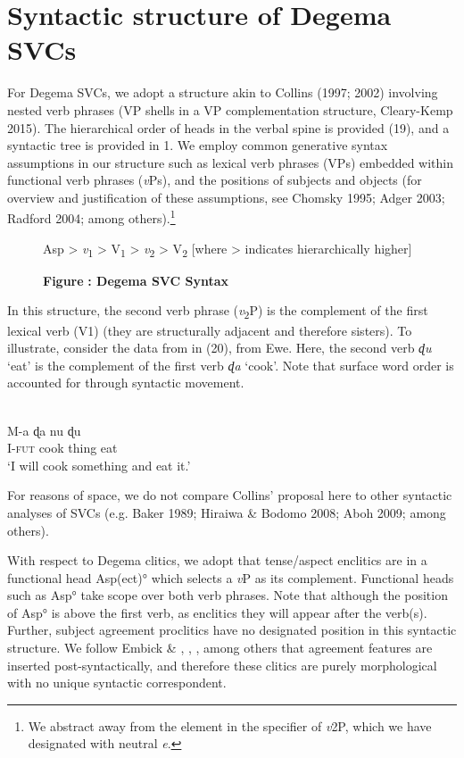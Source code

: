 \documentclass[output=paper]{langsci/langscibook}
\begin{document}
\section{Syntactic structure of Degema SVCs}
For Degema SVCs, we adopt a structure akin to Collins (1997; 2002) involving nested verb phrases (VP shells in a VP complementation structure, Cleary-Kemp 2015). The hierarchical order of heads in the verbal spine is provided (19), and a syntactic tree is provided in 1. We employ common generative syntax assumptions in our structure such as lexical verb phrases (VPs) embedded within functional verb phrases (\textit{v}Ps), and the positions of subjects and objects (for overview and justification of these assumptions, see Chomsky 1995; Adger 2003; Radford 2004; among others).\footnote{We abstract away from the element in the specifier of \textit{v}2P, which we have designated with neutral \textit{e}.
}

\begin{figure}
 
Asp > \textit{v}\textsubscript{1} > V\textsubscript{1} > \textit{v}\textsubscript{2} > V\textsubscript{2}
[where > indicates hierarchically higher]
\label{bkm:Ref449436541}
  
\textbf{Figure }\textbf{: Degema SVC Syntax}
\end{figure}

In this structure, the second verb phrase (\textit{v}\textsubscript{2}P) is the complement of the first lexical verb (V1) (they are structurally adjacent and therefore sisters). To illustrate, consider the data from \citet{Collins1997} in (20), from Ewe. Here, the second verb \textit{ɖu }‘eat’ is the complement of the first verb\textit{ ɖa }‘cook’. Note that surface word order is accounted for through syntactic movement.

\ea
{}\\
\gll  M-a  ɖa    nu    ɖu\\
     I-\textsc{fut}  cook  thing  eat\\
\glt ‘I will cook something and eat it.’ \citep[490-491]{Collins1997}
\z

For reasons of space, we do not compare Collins’ proposal here to other syntactic analyses of SVCs (e.g. Baker 1989; Hiraiwa \& Bodomo 2008; Aboh 2009; among others). 

With respect to Degema clitics, we adopt that tense/aspect enclitics are in a functional head Asp(ect)° which selects a \textit{v}P as its complement. Functional heads such as Asp° take scope over both verb phrases. Note that although the position of Asp° is above the first verb, as enclitics they will appear after the verb(s). Further, subject agreement proclitics have no designated position in this syntactic structure. We follow Embick \& \citet{Noyer2007}, \citet{Kramer2010}, \citet{Norris2014}, among others that agreement features are inserted post-syntactically, and therefore these clitics are purely morphological with no unique syntactic correspondent. 
\end{document}
